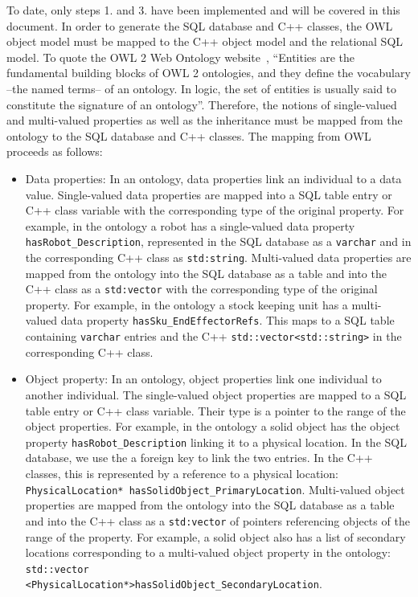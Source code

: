 To date, only steps 1. and 3. have been implemented and will be covered in this document.
In order to generate the SQL database and C++ classes, the OWL object model must be mapped to the C++ object model and the relational SQL model. 
To quote the OWL 2 Web Ontology website~\cite{OWLspec}, ``Entities are the fundamental building blocks of OWL 2 ontologies, 
and they define the vocabulary --the named terms-- of an ontology. In logic, the set of entities is usually said to constitute the 
signature of an ontology''. Therefore, the notions of single-valued and multi-valued properties as well as the inheritance must be 
mapped from the ontology to the SQL database and C++ classes. The mapping from OWL proceeds as follows:
\begin{itemize}
\item Data properties: In an ontology, data properties link an individual to a data value. Single-valued data properties are mapped into a SQL table entry or C++ class
variable with the corresponding type of the original property. For example, in the ontology a robot has a single-valued data 
property \texttt{hasRobot\_Description}, represented in the
SQL database as a \texttt{varchar} and in the corresponding C++ class as \texttt{std:string}. 
Multi-valued data properties are mapped from the ontology into the SQL database as a table and into the C++ class as a \texttt{std:vector} with the corresponding
type of the original property. For example,
in the ontology a stock keeping unit has a multi-valued
data property \texttt{hasSku\_EndEffectorRefs}. This maps to a SQL table containing \texttt{varchar} entries and the C++
\texttt{std::vector\textless std::string\textgreater} in the corresponding C++ class.

\item Object property: In an ontology, object properties link one individual to another individual. 
The single-valued object properties are mapped to a SQL table entry or C++ class
variable. Their type is a pointer to the range of the object properties. For example, in the ontology a solid object has the object property \texttt{hasRobot\_Description} 
linking it to a physical location. In the SQL database, we use the a foreign key to link the two entries. In the C++ classes, this is represented by a reference to a physical location: \texttt{PhysicalLocation* hasSolidObject\_PrimaryLocation}.
Multi-valued object properties are mapped from the ontology into the SQL database as a table and into the C++ class as a \texttt{std:vector} of pointers referencing objects of the range of the property.  For example, a solid object also has a list of secondary locations corresponding to a multi-valued object property in the ontology: {\scriptsize\texttt{std::vector\\ \textless PhysicalLocation*\textgreater hasSolidObject\_SecondaryLocation}}.
\end{itemize}

